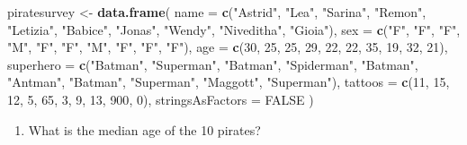 \documentclass[]{book}
\newenvironment{Shaded}{\begin{snugshade}}{\end{snugshade}}
\newcommand{\KeywordTok}[1]{\textcolor[rgb]{0.13,0.29,0.53}{\textbf{#1}}}
\newcommand{\DataTypeTok}[1]{\textcolor[rgb]{0.13,0.29,0.53}{#1}}
\newcommand{\DecValTok}[1]{\textcolor[rgb]{0.00,0.00,0.81}{#1}}
\newcommand{\StringTok}[1]{\textcolor[rgb]{0.31,0.60,0.02}{#1}}
\newcommand{\OtherTok}[1]{\textcolor[rgb]{0.56,0.35,0.01}{#1}}
\newcommand{\OperatorTok}[1]{\textcolor[rgb]{0.81,0.36,0.00}{\textbf{#1}}}
\newcommand{\NormalTok}[1]{#1}
\providecommand{\tightlist}{%
  \setlength{\itemsep}{0pt}\setlength{\parskip}{0pt}}
\theoremstyle{definition}
\theoremstyle{definition}
\theoremstyle{remark}
\begin{document}
\begin{Shaded}
\begin{Highlighting}[]
\NormalTok{piratesurvey <-}\StringTok{ }\KeywordTok{data.frame}\NormalTok{(}
  \DataTypeTok{name =} \KeywordTok{c}\NormalTok{(}\StringTok{"Astrid"}\NormalTok{, }\StringTok{"Lea"}\NormalTok{, }\StringTok{"Sarina"}\NormalTok{, }\StringTok{"Remon"}\NormalTok{, }\StringTok{"Letizia"}\NormalTok{, }\StringTok{"Babice"}\NormalTok{, }\StringTok{"Jonas"}\NormalTok{, }\StringTok{"Wendy"}\NormalTok{, }\StringTok{"Niveditha"}\NormalTok{, }\StringTok{"Gioia"}\NormalTok{),}
  \DataTypeTok{sex =} \KeywordTok{c}\NormalTok{(}\StringTok{"F"}\NormalTok{, }\StringTok{"F"}\NormalTok{, }\StringTok{"F"}\NormalTok{, }\StringTok{"M"}\NormalTok{, }\StringTok{"F"}\NormalTok{, }\StringTok{"F"}\NormalTok{, }\StringTok{"M"}\NormalTok{, }\StringTok{"F"}\NormalTok{, }\StringTok{"F"}\NormalTok{, }\StringTok{"F"}\NormalTok{),}
  \DataTypeTok{age =} \KeywordTok{c}\NormalTok{(}\DecValTok{30}\NormalTok{, }\DecValTok{25}\NormalTok{, }\DecValTok{25}\NormalTok{, }\DecValTok{29}\NormalTok{, }\DecValTok{22}\NormalTok{, }\DecValTok{22}\NormalTok{, }\DecValTok{35}\NormalTok{, }\DecValTok{19}\NormalTok{, }\DecValTok{32}\NormalTok{, }\DecValTok{21}\NormalTok{),}
  \DataTypeTok{superhero =} \KeywordTok{c}\NormalTok{(}\StringTok{"Batman"}\NormalTok{, }\StringTok{"Superman"}\NormalTok{, }\StringTok{"Batman"}\NormalTok{, }\StringTok{"Spiderman"}\NormalTok{, }\StringTok{"Batman"}\NormalTok{,}
               \StringTok{"Antman"}\NormalTok{, }\StringTok{"Batman"}\NormalTok{, }\StringTok{"Superman"}\NormalTok{, }\StringTok{"Maggott"}\NormalTok{, }\StringTok{"Superman"}\NormalTok{),}
  \DataTypeTok{tattoos =} \KeywordTok{c}\NormalTok{(}\DecValTok{11}\NormalTok{, }\DecValTok{15}\NormalTok{, }\DecValTok{12}\NormalTok{, }\DecValTok{5}\NormalTok{, }\DecValTok{65}\NormalTok{, }\DecValTok{3}\NormalTok{, }\DecValTok{9}\NormalTok{, }\DecValTok{13}\NormalTok{, }\DecValTok{900}\NormalTok{, }\DecValTok{0}\NormalTok{),}
  \DataTypeTok{stringsAsFactors =} \OtherTok{FALSE}
\NormalTok{)}
\end{Highlighting}
\end{Shaded}

\begin{enumerate}
\def\labelenumi{\arabic{enumi}.}
\setcounter{enumi}{1}
\tightlist
\item
  What is the median age of the 10 pirates?
\end{enumerate}

\begin{Shaded}
\end{Shaded}
\end{document}
